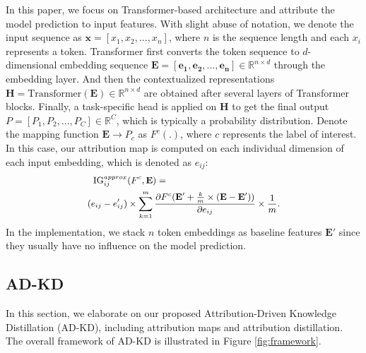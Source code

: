 \documentclass[11pt]{article}
\begin{document}
In this paper, we focus on Transformer-based architecture and attribute the model prediction to input features. With slight abuse of notation, we denote the input sequence as $\mathbf{x} = [x_1, x_2, ..., x_n]$, where $n$ is the sequence length and each $x_i$ represents a token. Transformer first converts the token sequence to $d$-dimensional embedding sequence $\mathbf{E} = [\mathbf{e_1}, \mathbf{e_2}, ... , \mathbf{e_n}] \in \mathbb{R}^{n\times d}$ through the embedding layer. And then the contextualized representations $\mathbf{H} =\text{Transformer}(\mathbf{E}) \in \mathbb{R}^{n\times d}$ are obtained after several layers of Transformer blocks. Finally, a task-specific head is applied on $\mathbf{H}$ to get the final output $P = [P_1, P_2, ... , P_C] \in \mathbb{R}^C$, which is typically a probability distribution. Denote the mapping function $\mathbf{E}\rightarrow P_c$ as $F^c(.)$, where $c$ represents the label of interest. In this case, our attribution map is computed on each individual dimension of each input embedding, which is denoted as $e_{ij}$:
\begin{equation}
\small
\begin{aligned}\label{eq:ig}
    \text{IG}_{ij}^{approx}&(F^c,\mathbf{E}) = \\
    (e_{ij}-e'_{ij})&\times \sum_{k=1}^m \frac{\partial F^c(\mathbf{E}'+\frac{k}{m} \times (\mathbf{E}-\mathbf{E}'))}{\partial e_{ij}} \times \frac{1}{m}.
\end{aligned}
\end{equation}
In the implementation, we stack $n$ \text{[PAD]} token embeddings as baseline features $\mathbf{E}'$ since they usually have no influence on the model prediction.

\subsection{AD-KD}
In this section, we elaborate on our proposed Attribution-Driven Knowledge Distillation (AD-KD), including attribution maps and attribution distillation. The overall framework of AD-KD is illustrated in Figure \ref{fig:framework}.
\end{document}

